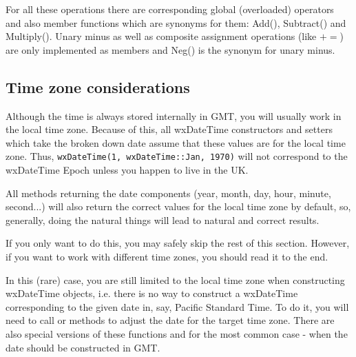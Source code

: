 \begin{twocollist}\itemsep=0pt
\end{twocollist}

For all these operations there are corresponding global (overloaded) operators
and also member functions which are synonyms for them: Add(), Subtract() and
Multiply(). Unary minus as well as composite assignment operations (like $+=$)
are only implemented as members and Neg() is the synonym for unary minus.

\subsection{Time zone considerations}\label{tdatetimezones}

Although the time is always stored internally in GMT, you will usually work in
the local time zone. Because of this, all wxDateTime constructors and setters
which take the broken down date assume that these values are for the local
time zone. Thus, {\tt wxDateTime(1, wxDateTime::Jan, 1970)} will not
correspond to the wxDateTime Epoch unless you happen to live in the UK.

All methods returning the date components (year, month, day, hour, minute,
second...) will also return the correct values for the local time zone by
default, so, generally, doing the natural things will lead to natural and
correct results.

If you only want to do this, you may safely skip the rest of this section.
However, if you want to work with different time zones, you should read it to
the end.

In this (rare) case, you are still limited to the local time zone when
constructing wxDateTime objects, i.e. there is no way to construct a
wxDateTime corresponding to the given date in, say, Pacific Standard Time.
To do it, you will need to call  or 
 methods to adjust the date for
the target time zone. There are also special versions of these functions 
 and  for
the most common case - when the date should be constructed in GMT.

